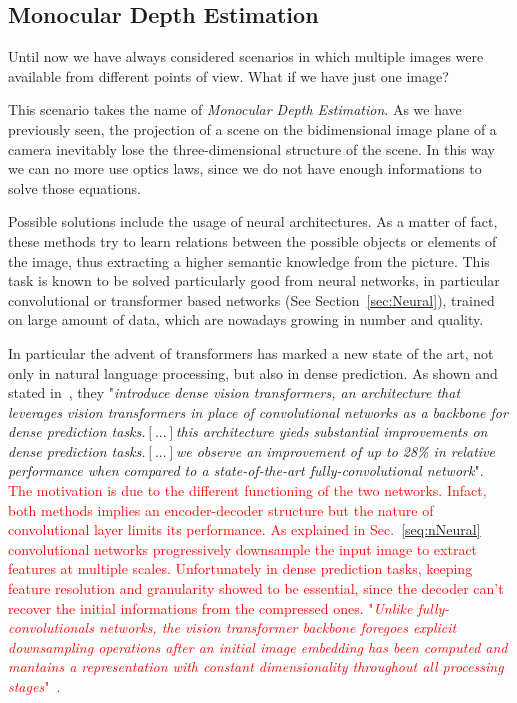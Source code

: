 \subsection{Monocular Depth Estimation}
Until now we have always considered scenarios in which multiple images were 
available from different points of view. What if we have just one image?

This scenario takes the name of \textit{Monocular Depth Estimation}. As we have previously seen,
the projection of a scene on the bidimensional image plane of a camera inevitably lose the three-dimensional
structure of the scene. In this way we can no more use optics laws, since we do not have enough informations to 
solve those equations.

Possible solutions include the usage of neural architectures. As a matter of fact, these methods try to learn relations
between the possible objects or elements of the image, thus extracting a higher semantic knowledge from the picture.
This task is known to be solved particularly good from neural networks, in particular convolutional or transformer based 
networks (See Section~\ref{sec:Neural}), trained on large amount of data, which are nowadays growing in number and quality.

In particular the advent of transformers has marked a new state of the art, not only in natural language processing, but also in dense prediction.
As shown and stated in~\cite{Ranftl2021}, they "\textit{introduce dense vision transformers, an architecture that leverages vision transformers 
in place of convolutional networks as a backbone for dense prediction tasks.$[...]$this architecture yieds substantial improvements
on dense prediction tasks.$[...]$we observe an improvement of up to 28\% in relative performance when compared to a state-of-the-art 
fully-convolutional network}". \textcolor{red}{The motivation is due to the different functioning of the two networks. Infact, both methods
implies an encoder-decoder structure but the nature of convolutional layer limits its performance. As explained in Sec.~\ref{seq:nNeural}
convolutional networks progressively downsample the input image to extract features at multiple scales. Unfortunately in 
dense prediction tasks, keeping feature resolution and granularity showed to be essential, since the decoder can't recover
the initial informations from the compressed ones. "\textit{Unlike fully-convolutionals networks, the vision transformer
backbone foregoes explicit downsampling operations after an initial image embedding has been computed
and mantains a representation with constant dimensionality throughout all processing stages}"~\cite{Ranftl2021}.
}

